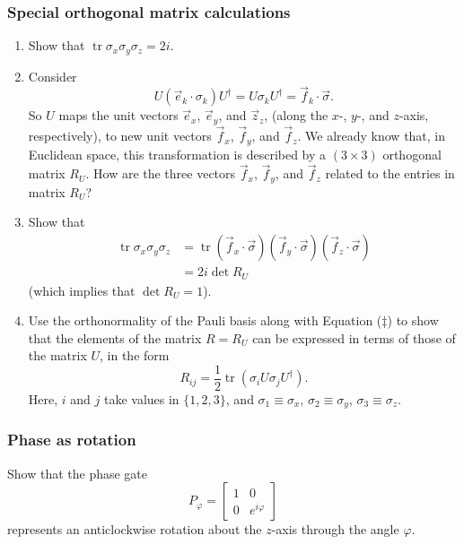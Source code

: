 \documentclass[fleqn]{article}
\begin{document}
\hypertarget{special-orthogonal-matrix-calculations}{%
\subsubsection{Special orthogonal matrix calculations}\label{special-orthogonal-matrix-calculations}}

\begin{enumerate}
\def\labelenumi{\arabic{enumi}.}
\item
  Show that \(\operatorname{tr}\sigma_x\sigma_y\sigma_z = 2i\).
\item
  Consider
  \[
     U(\vec e_k\cdot\sigma_k)U^\dagger=U\sigma_kU^\dagger={\vec f_k}\cdot\vec\sigma.
   \]
  So \(U\) maps the unit vectors \(\vec e_x\), \(\vec e_y\), and \(\vec z_z\), (along the \(x\)-, \(y\)-, and \(z\)-axis, respectively), to new unit vectors \(\vec f_x\), \(\vec f_y\), and \(\vec f_z\).
  We already know that, in Euclidean space, this transformation is described by a \((3\times 3)\) orthogonal matrix \(R_U\).
  How are the three vectors \(\vec f_x\), \(\vec f_y\), and \(\vec f_z\) related to the entries in matrix \(R_U\)?
\item
  Show that
  \[
     \begin{aligned}
       \operatorname{tr}\sigma_x\sigma_y\sigma_z
       &= \operatorname{tr}({\vec f_x}\cdot\vec\sigma)( {\vec f_y}\cdot\vec\sigma)({\vec f_z}\cdot\vec\sigma)
     \\&= 2i\det R_U
     \end{aligned}
   \]
  (which implies that \(\det R_U=1\)).
\item
  Use the orthonormality of the Pauli basis along with Equation (\(\ddagger\)) to show that the elements of the matrix \(R=R_U\) can be expressed in terms of those of the matrix \(U\), in the form
  \[
     R_{ij}=\frac12\operatorname{tr}\left(\sigma_i U\sigma_j U^\dagger\right).
   \]
  Here, \(i\) and \(j\) take values in \(\{1,2,3\}\), and \(\sigma_1\equiv\sigma_x\), \(\sigma_2\equiv\sigma_y\), \(\sigma_3\equiv\sigma_z\).
\end{enumerate}

\hypertarget{phase-as-rotation}{%
\subsubsection{Phase as rotation}\label{phase-as-rotation}}

Show that the phase gate
\[
  P_\varphi = \begin{bmatrix}1&0\\0&e^{i\varphi}\end{bmatrix}
\]
represents an anticlockwise rotation about the \(z\)-axis through the angle \(\varphi\).
\end{document}
